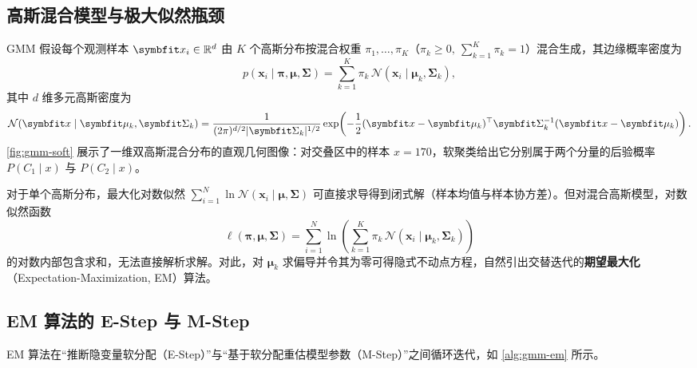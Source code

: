 \subsection{高斯混合模型与极大似然瓶颈}

GMM 假设每个观测样本 $\bm{x}_i\in\R^d$ 由 $K$ 个高斯分布按混合权重 $\pi_1, \dots, \pi_K$（$\pi_k\ge 0,\ \sum_{k=1}^{K}\pi_k = 1$）混合生成，其边缘概率密度为
\begin{equation}\label{eq:gmm-density}
  p(\bm{x}_i \mid \bm{\pi}, \bm{\mu}, \bm{\Sigma})
  = \sum_{k=1}^{K} \pi_k\,\mathcal{N}(\bm{x}_i \mid \bm{\mu}_k, \bm{\Sigma}_k),
\end{equation}
其中 $d$ 维多元高斯密度为
\[
  \mathcal{N}(\bm{x} \mid \bm{\mu}_k, \bm{\Sigma}_k)
  = \frac{1}{(2\pi)^{d/2}\abs{\bm{\Sigma}_k}^{1/2}}
    \exp\!\left(-\frac{1}{2}(\bm{x}-\bm{\mu}_k)^\top \bm{\Sigma}_k^{-1}(\bm{x}-\bm{\mu}_k)\right).
\]
\cref{fig:gmm-soft} 展示了一维双高斯混合分布的直观几何图像：对交叠区中的样本 $x=170$，软聚类给出它分别属于两个分量的后验概率 $P(C_1\mid x)$ 与 $P(C_2\mid x)$。


对于单个高斯分布，最大化对数似然 $\sum_{i=1}^{N}\ln\mathcal{N}(\bm{x}_i\mid \bm{\mu}, \bm{\Sigma})$ 可直接求导得到闭式解（样本均值与样本协方差）。但对混合高斯模型，对数似然函数
\[
  \ell(\bm{\pi}, \bm{\mu}, \bm{\Sigma}) = \sum_{i=1}^{N}\ln\left(\sum_{k=1}^{K}\pi_k\,\mathcal{N}(\bm{x}_i\mid \bm{\mu}_k, \bm{\Sigma}_k)\right)
\]
的对数内部包含求和，无法直接解析求解。对此，对 $\bm{\mu}_k$ 求偏导并令其为零可得隐式不动点方程，自然引出交替迭代的\textbf{期望最大化}（Expectation-Maximization, EM）算法。

\subsection{EM 算法的 E-Step 与 M-Step}

EM 算法在“推断隐变量软分配（E-Step）”与“基于软分配重估模型参数（M-Step）”之间循环迭代，如 \cref{alg:gmm-em} 所示。

